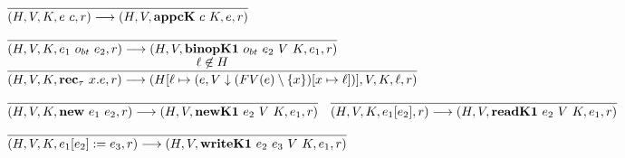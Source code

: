 \documentclass[fleqn]{article}
\begin{document}
\[\begin{array}{l}
\infer{(H,V,K,e~c,r) \longrightarrow (H,V,\mathbf{appcK}~c~K,e,r)}{\vspace{1em}} \\
\infer{(H,V,K,e_1~o_{bt}~e_2,r) \longrightarrow (H,V,\mathbf{binopK1}~o_{bt}~e_2~V~K,e_1,r)}{\vspace{1em}} \\
\infer{(H,V,K,\mathbf{rec}_\tau~x.e,r) \longrightarrow (H[\ell \mapsto (e,V \downarrow (FV(e) \setminus \{x\})[x \mapsto \ell])], V, K,\ell ,r)}{\ell \not\in H} \\
\infer{(H,V,K,\mathbf{new}~e_1~e_2,r) \longrightarrow (H,V,\mathbf{newK1}~e_2~V~K,e_1,r)}{\vspace{1em}} \hspace{1em}
\infer{(H,V,K,e_1[e_2],r) \longrightarrow (H,V,\mathbf{readK1}~e_2~V~K,e_1,r)}{\vspace{1em}} \\
\infer{(H,V,K,e_1[e_2]:=e_3,r) \longrightarrow (H,V,\mathbf{writeK1}~e_2~e_3~V~K,e_1,r)}{\vspace{1em}} \\
\end{array}
\]
\end{document}
